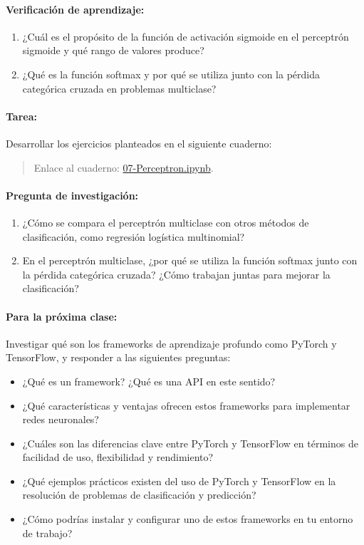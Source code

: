 \documentclass[a4,11pt]{aleph-notas}
\begin{document}
\paragraph{Verificación de aprendizaje:}
\begin{enumerate}[leftmargin=*]
    \item ¿Cuál es el propósito de la función de activación sigmoide en el perceptrón sigmoide y qué rango de valores produce?
    
    \item ¿Qué es la función softmax y por qué se utiliza junto con la pérdida categórica cruzada en problemas multiclase?
\end{enumerate}

\paragraph{Tarea:}
Desarrollar los ejercicios planteados en el siguiente cuaderno:
\begin{quote}
    Enlace al cuaderno: \href{https://colab.research.google.com/github/andres-merino/AprendizajeAutomaticoInicial-05-N0105/blob/main/2-Ejercicios/07-Perceptron.ipynb}{07-Perceptron.ipynb}.
\end{quote}

\paragraph{Pregunta de investigación:}  
\begin{enumerate}[leftmargin=*]
    \item ¿Cómo se compara el perceptrón multiclase con otros métodos de clasificación, como regresión logística multinomial?
    \item En el perceptrón multiclase, ¿por qué se utiliza la función softmax junto con la pérdida categórica cruzada? ¿Cómo trabajan juntas para mejorar la clasificación?
\end{enumerate}
    
\paragraph{Para la próxima clase:} 
Investigar qué son los frameworks de aprendizaje profundo como PyTorch y TensorFlow, y responder a las siguientes preguntas:
\begin{itemize}[leftmargin=*]
    \item ¿Qué es un framework? ¿Qué es una API en este sentido?
    \item ¿Qué características y ventajas ofrecen estos frameworks para implementar redes neuronales?
    \item ¿Cuáles son las diferencias clave entre PyTorch y TensorFlow en términos de facilidad de uso, flexibilidad y rendimiento?
    \item ¿Qué ejemplos prácticos existen del uso de PyTorch y TensorFlow en la resolución de problemas de clasificación y predicción?
    \item ¿Cómo podrías instalar y configurar uno de estos frameworks en tu entorno de trabajo?
\end{itemize}
\end{document}
